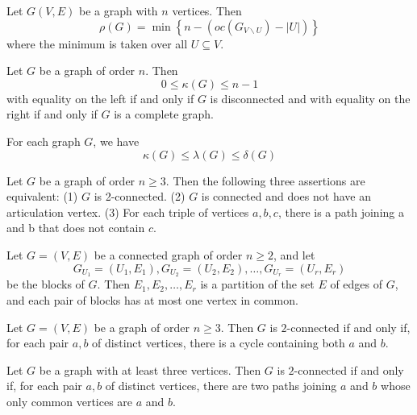 \begin{theorem}
  \label{thm:12.5.5}
  Let $G(V, E)$ be a graph with $n$ vertices. Then
  $$
  \rho(G)=\min \left\{n-\left(o c\left(G_{V \backslash U}\right)-|U|\right)\right\}
  $$
  where the minimum is taken over all $U \subseteq V$.
\end{theorem}

\begin{theorem}
  \label{thm:12.6.1}
  Let $G$ be a graph of order $n$. Then
  $$
  0 \leq \kappa(G) \leq n-1
  $$
  with equality on the left if and only if $G$ is disconnected and with equality on the right if and only if $G$ is a complete graph.
\end{theorem}

\begin{theorem}
  \label{thm:12.6.2}
  For each graph $G$, we have
  $$ \kappa(G) \leq \lambda(G) \leq \delta(G) $$
\end{theorem}

\begin{theorem}
  \label{thm:12.6.3}
  Let $G$ be a graph of order $n \geq 3$. Then the following three assertions are equivalent:
  (1) $G$ is 2-connected.
  (2) $G$ is connected and does not have an articulation vertex.
  (3) For each triple of vertices $a, b, c$, there is a path joining a and b that does not contain $c$.
\end{theorem}

\begin{theorem}
  \label{thm:12.6.4}
  Let $G=(V, E)$ be a connected graph of order $n \geq 2$, and let
  $$
  G_{U_1}=\left(U_1, E_1\right), G_{U_2}=\left(U_2, E_2\right), \ldots, G_{U_r}=\left(U_r, E_r\right)
  $$
  be the blocks of $G$. Then $E_1, E_2, \ldots, E_r$ is a partition of the set $E$ of edges of $G$, and each pair of blocks has at most one vertex in common.
\end{theorem}

\begin{theorem}
  \label{thm:12.6.5}
  Let $G = (V, E)$ be a graph of order $n \geq 3$. Then $G$ is $2$-connected if and only if, for each pair $a, b$ of distinct vertices, there is a cycle containing both $a$ and $b$.
\end{theorem}

\begin{corollary}
  \label{cor:12.6.6}
  Let $G$ be a graph with at least three vertices. Then $G$ is $2$-connected if and only if, for each pair $a, b$ of distinct vertices, there are two paths joining $a$ and $b$ whose only common vertices are $a$ and $b$.
\end{corollary}

